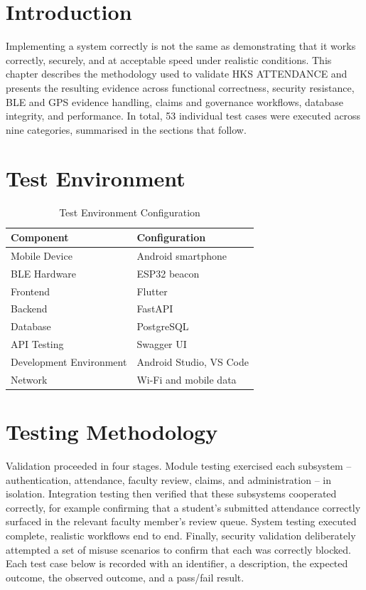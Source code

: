 \documentclass[12pt, a4paper, oneside]{report}
\begin{document}
\section{Introduction}

Implementing a system correctly is not the same as demonstrating that it works correctly, securely, and at acceptable speed under realistic conditions. This chapter describes the methodology used to validate HKS ATTENDANCE and presents the resulting evidence across functional correctness, security resistance, BLE and GPS evidence handling, claims and governance workflows, database integrity, and performance. In total, 53 individual test cases were executed across nine categories, summarised in the sections that follow.

\section{Test Environment}

\begin{table}[htbp]
\centering
\caption{Test Environment Configuration}
\label{tab:test-env}
\begin{tabularx}{\textwidth}{|l|X|}
\hline
\textbf{Component} & \textbf{Configuration} \\
\hline
Mobile Device & Android smartphone \\
\hline
BLE Hardware & ESP32 beacon \\
\hline
Frontend & Flutter \\
\hline
Backend & FastAPI \\
\hline
Database & PostgreSQL \\
\hline
API Testing & Swagger UI \\
\hline
Development Environment & Android Studio, VS Code \\
\hline
Network & Wi-Fi and mobile data \\
\hline
\end{tabularx}
\end{table}

\section{Testing Methodology}

Validation proceeded in four stages. Module testing exercised each subsystem -- authentication, attendance, faculty review, claims, and administration -- in isolation. Integration testing then verified that these subsystems cooperated correctly, for example confirming that a student's submitted attendance correctly surfaced in the relevant faculty member's review queue. System testing executed complete, realistic workflows end to end. Finally, security validation deliberately attempted a set of misuse scenarios to confirm that each was correctly blocked. Each test case below is recorded with an identifier, a description, the expected outcome, the observed outcome, and a pass/fail result.
\end{document}
